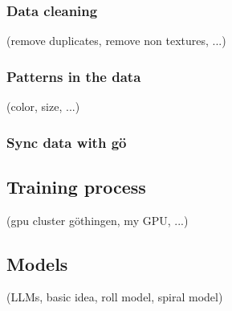     \subsubsection{Data cleaning}
        (remove duplicates, remove non textures, ...)
    \subsubsection{Patterns in the data}
        (color, size, ...)
    \subsubsection{Sync data with gö}


\subsection{Training process}
    (gpu cluster göthingen, my GPU, ...)

\subsection{Models}
    (LLMs, basic idea, roll model, spiral model)